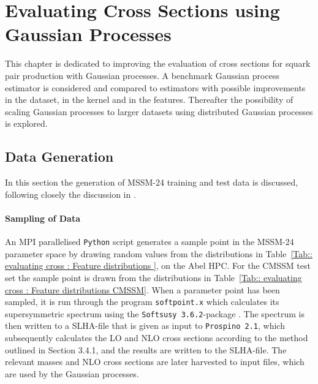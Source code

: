 \documentclass[twoside,english]{uiofysmaster}
\begin{document}
{{%



\chapter{Evaluating Cross Sections using Gaussian Processes}\label{Chapter:Evaluating Cross Sections using Gaussian Processes}


This chapter is dedicated to improving the evaluation of cross sections for squark pair production with Gaussian processes. A benchmark Gaussian process estimator is considered and compared to estimators with possible improvements in the dataset, in the kernel and in the features. Thereafter the possibility of scaling Gaussian processes to larger datasets using distributed Gaussian processes is explored.

\section{Data Generation}

In this section the generation of MSSM-24 training and test data is discussed, following closely the discussion in \cite{sparre2018fast}. 

\subsubsection{Sampling of Data}

An MPI parallelised \verb|Python| script generates a sample point in the MSSM-24 parameter space by drawing random values from the distributions in Table~\ref{Tab:: evaluating cross : Feature distributions }, on the Abel HPC. For the CMSSM test set the sample point is drawn from the distributions in Table~\ref{Tab:: evaluating cross : Feature distributions CMSSM}. When a parameter point has been sampled, it is run through the program \verb|softpoint.x| which calculates its supersymmetric spectrum using the \verb|Softsusy 3.6.2|-package \cite{Allanach:2001kg}. The spectrum is then written to a SLHA-file \cite{Skands:2003cj} that is given as input to \verb|Prospino 2.1|, which subsequently calculates the LO and NLO cross sections according to the method outlined in Section 3.4.1, and the results are written to the SLHA-file. The relevant masses and NLO cross sections are later harvested to input files, which are used by the Gaussian processes. 

}}
\end{document}
